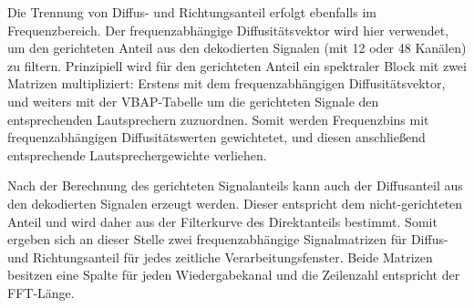 

Die Trennung von Diffus- und Richtungsanteil erfolgt ebenfalls im Frequenzbereich. Der frequenzabhängige Diffusitätsvektor wird hier verwendet, um den gerichteten Anteil aus den dekodierten Signalen (mit 12 oder 48 Kanälen) zu filtern. Prinzipiell wird für den gerichteten Anteil ein spektraler Block mit zwei Matrizen multipliziert: Erstens mit dem frequenzabhängigen Diffusitätsvektor, und weiters mit der VBAP-Tabelle um die gerichteten Signale den entsprechenden Lautsprechern zuzuordnen. Somit werden Frequenzbins mit frequenzabhängigen Diffusitätswerten gewichtetet, und diesen anschließend entsprechende Lautsprechergewichte verliehen.

Nach der Berechnung des gerichteten Signalanteils kann auch der Diffusanteil aus den dekodierten Signalen erzeugt werden. Dieser entspricht dem nicht-gerichteten Anteil und wird daher aus der Filterkurve des Direktanteils bestimmt. Somit ergeben sich an dieser Stelle zwei frequenzabhängige Signalmatrizen für Diffus- und Richtungsanteil für jedes zeitliche Verarbeitungsfenster. Beide Matrizen besitzen eine Spalte für jeden Wiedergabekanal und die Zeilenzahl entspricht der FFT-Länge.